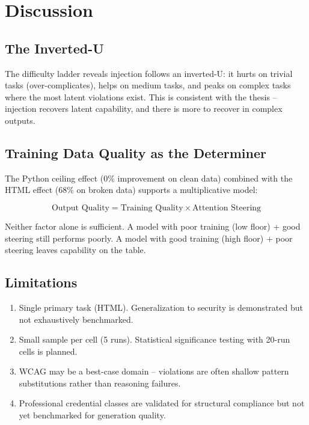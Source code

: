 \documentclass{article}
\begin{document}
\section{Discussion}

\subsection{The Inverted-U}

The difficulty ladder reveals injection follows an inverted-U: it hurts on
trivial tasks (over-complicates), helps on medium tasks, and peaks on complex
tasks where the most latent violations exist. This is consistent with the
thesis -- injection recovers latent capability, and there is more to recover
in complex outputs.

\subsection{Training Data Quality as the Determiner}

The Python ceiling effect (0\% improvement on clean data) combined with the
HTML effect (68\% on broken data) supports a multiplicative model:

\[
\text{Output Quality} = \text{Training Quality} \times \text{Attention Steering}
\]

Neither factor alone is sufficient. A model with poor training (low floor) +
good steering still performs poorly. A model with good training (high floor) +
poor steering leaves capability on the table.

\subsection{Limitations}

\begin{enumerate}
\item Single primary task (HTML). Generalization to security is demonstrated
but not exhaustively benchmarked.
\item Small sample per cell (5 runs). Statistical significance testing with
20-run cells is planned.
\item WCAG may be a best-case domain -- violations are often shallow pattern
substitutions rather than reasoning failures.
\item Professional credential classes are validated for structural compliance
but not yet benchmarked for generation quality.
\end{enumerate}
\end{document}
